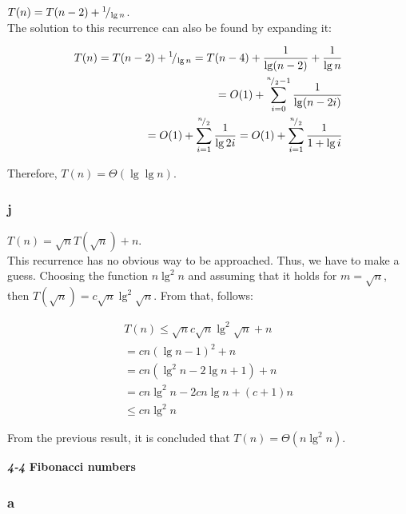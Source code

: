 \documentclass[8pt,a4paper]{article}
\begin{document}
$T(n) = T(n - 2) + {}^{1}\!/_{\lg n}$. \\

  The solution to this recurrence can also be found by expanding it:

\begin{equation*}
  \begin{split}
    T(n) = T(n - 2) + {}^{1}\!/_{\lg n} = T(n - 4) + \frac{1}{\lg(n - 2)} + \frac{1}{\lg n} \\
    = O(1) + \sum\limits_{i = 0}^{{}^{n}\!/_{2} - 1} \frac{1}{\lg(n - 2i)} \\
    = O(1) + \sum\limits_{i = 1}^{{}^{n}\!/_{2}} \frac{1}{\lg 2i}
    = O(1) + \sum\limits_{i = 1}^{{}^{n}\!/_{2}} \frac{1}{1 + \lg i}
  \end{split}
\end{equation*}

  Therefore, $T(n) = \Theta(\lg \lg n)$.

\subsubsection*{j}

$T(n) = \sqrt{n}T(\sqrt{n}) + n$. \\

  This recurrence has no obvious way to be approached. Thus, we have to make a guess.
Choosing the function $n \lg^{2} n$ and assuming that it holds for $m = \sqrt{n}$,
then $T(\sqrt{n}) = c\sqrt{n} \lg^{2} \sqrt{n}$. From that, follows:

\begin{equation*}
  \begin{split}
    T(n) \leq \sqrt{n} c\sqrt{n} \lg^{2} \sqrt{n} + n \\
    = cn (\lg n - 1)^{2} + n \\
    = cn(\lg^{2} n - 2\lg n + 1) + n \\
    = cn\lg^{2}n -2cn\lg n + (c + 1)n \\
    \leq cn\lg^{2} n
  \end{split}
\end{equation*}

  From the previous result, it is concluded that $T(n) = \Theta(n \lg^{2} n)$. \\

\begin{framed}
\textbf{\textit{4-4} Fibonacci numbers}
\end{framed}

\subsubsection*{a}
\end{document}
